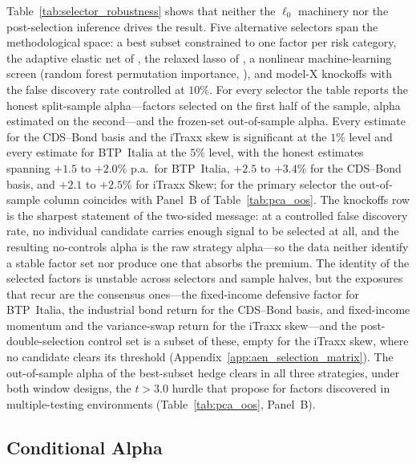 Table~\ref{tab:selector_robustness} shows that neither the $\ell_0$
machinery nor the post-selection inference drives the result. Five
alternative selectors span the methodological space: a
best subset constrained to one factor per risk category, the adaptive
elastic net of \citet{zou2009adaptive}, the relaxed lasso of
\citet{meinshausen2007relaxed}, a nonlinear machine-learning screen
(random forest permutation importance, \citealp{breiman2001random}),
and model-X knockoffs \citep{candes2018panning} with the
false discovery rate controlled at $10\%$. For every selector the
table reports the honest split-sample alpha---factors selected on the
first half of the sample, alpha estimated on the second---and the
frozen-set out-of-sample alpha. Every estimate for the CDS--Bond basis
and the iTraxx skew is significant at the $1\%$ level and every
estimate for BTP~Italia at the $5\%$ level, with the honest estimates
spanning $+1.5$ to $+2.0\%$ p.a.\ for BTP~Italia, $+2.5$ to $+3.4\%$ for the CDS--Bond basis, and
$+2.1$ to $+2.5\%$ for iTraxx Skew; for the primary selector the
out-of-sample column coincides with Panel~B of
Table~\ref{tab:pca_oos}. The knockoffs row is the sharpest statement
of the two-sided message: at a controlled false discovery rate, no
individual candidate carries enough signal to be selected at all, and
the resulting no-controls alpha is the raw strategy alpha---so the
data neither identify a stable factor set nor produce one that
absorbs the premium. The identity of the selected factors is
unstable across selectors and sample halves, but the exposures that
recur are the consensus ones---the fixed-income defensive factor for
BTP~Italia, the industrial bond return for the CDS--Bond basis, and
fixed-income momentum and the variance-swap return for the iTraxx
skew---and the post-double-selection control set is a subset of these,
empty for the iTraxx skew, where no candidate clears its threshold
(Appendix~\ref{app:aen_selection_matrix}). The out-of-sample alpha of
the best-subset hedge clears in all three strategies, under both window
designs, the $t>3.0$ hurdle that \citet{harvey2016and} propose for
factors discovered in multiple-testing environments
(Table~\ref{tab:pca_oos}, Panel~B).



\subsection{Conditional Alpha}
\label{sec:conditional_alpha}

